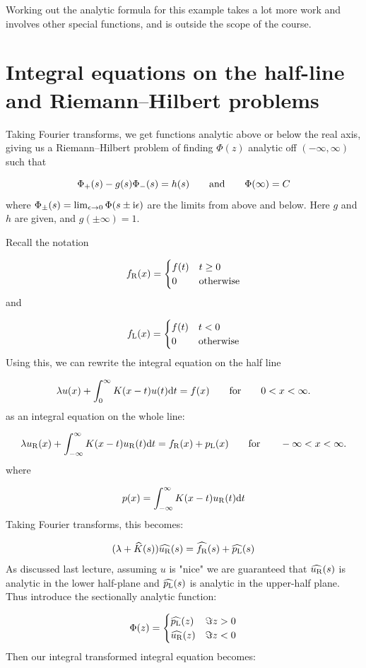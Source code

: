 \documentclass[12pt,a4paper]{article}
\def\qqand{\qquad\hbox{and}\qquad}
\def\qqfor{\qquad\hbox{for}\qquad}
\def\D{ {\rm d} }
\def\I{ {\rm i} }
\def\dt{\D t}
\def\endash{–}
\begin{document}
Working out the analytic formula for this example takes a lot more work and involves other special functions,  and is outside the scope of the course.

\section{Integral equations on the half-line and Riemann\ensuremath{\endash}Hilbert problems}
Taking Fourier transforms, we get functions analytic above or below the real axis,  giving us a Riemann\ensuremath{\endash}Hilbert problem of finding $\Phi(z)$ analytic off $(-\infty,\infty)$ such that

\[
\Phi_+(s) - g(s)\Phi_-(s) = h(s) \qqand \Phi(\infty) = C
\]
where $\Phi_\pm(s) = \lim_{\epsilon \rightarrow 0} \Phi(s \pm \I \epsilon)$  are the limits from above and below.  Here $g$ and $h$ are given, and $g(\pm \infty) = 1$.

Recall the notation

\[
f_{\rm R}(x) = \begin{cases}f(t) & t \geq 0 \\ 0 & \hbox{otherwise} \end{cases}
\]
and

\[
f_{\rm L}(x) = \begin{cases}f(t) & t < 0 \\ 0 & \hbox{otherwise} \end{cases}
\]
Using this, we can rewrite the integral equation on the half line

\[
\lambda u(x) + \int_{0}^\infty K(x-t)u(t) \dt = f(x)\qqfor 0 < x < \infty.
\]
as an integral equation on the whole line:

\[
\lambda u_{\rm R}(x) + \int_{-\infty}^\infty K(x-t)u_{\rm R}(t) \dt = f_{\rm R}(x) + p_{\rm L}(x)\qqfor -\infty < x < \infty.
\]
where 

\[
p(x) = \int_{-\infty}^\infty K(x-t)u_{\rm R}(t) \dt
\]
Taking Fourier transforms, this becomes:

\[
(\lambda + \widehat K(s)) \widehat{u_{\rm R}}(s) = \widehat{f_{\rm R}}(s) + \widehat{p_{\rm L}}(s)
\]
As discussed last lecture, assuming $u$ is "nice" we are guaranteed that $\widehat{ u_{\rm R}}(s)$  is analytic in the lower half-plane and $\widehat{ p_{\rm L}}(s)$ is analytic in the upper-half plane.   Thus introduce the sectionally analytic function:

\[
\Phi(z) = \begin{cases}  \widehat{p_{\rm L}}(z) & \Im z > 0 \\ 
                            \widehat{u_{\rm R}}(z) & \Im z < 0 
                            \end{cases}
\]
Then our integral transformed integral equation becomes:
\end{document}

